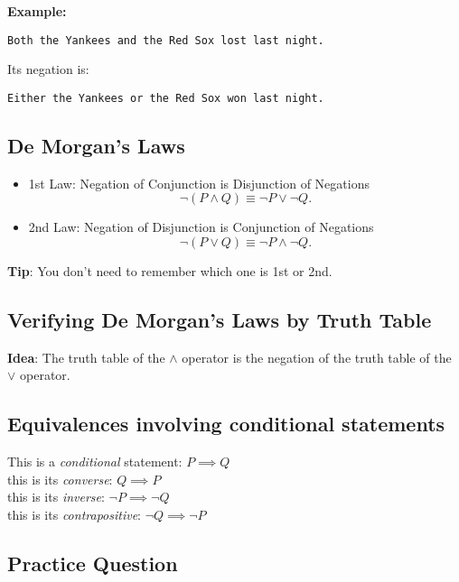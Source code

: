 \documentclass[11pt]{article}
\providecommand{\tightlist}{%
      \setlength{\itemsep}{0pt}\setlength{\parskip}{0pt}}
\begin{document}
\textbf{Example:}

\begin{verbatim}
Both the Yankees and the Red Sox lost last night.  
\end{verbatim}

Its negation is:

\begin{verbatim}
Either the Yankees or the Red Sox won last night.
\end{verbatim}

    \subsection{De Morgan's Laws}\label{de-morgans-laws}

\begin{itemize}
\tightlist
\item
  1st Law: Negation of Conjunction is Disjunction of Negations
  \[\neg (P \land Q) \equiv \neg P \lor \neg Q.\]
\item
  2nd Law: Negation of Disjunction is Conjunction of Negations
  \[\neg (P \lor Q) \equiv \neg P \land \neg Q.\]
\end{itemize}

    \textbf{Tip}: You don't need to remember which one is 1st or 2nd.

    \subsection{Verifying De Morgan's Laws by Truth
Table}\label{verifying-de-morgans-laws-by-truth-table}

\textbf{Idea}: The truth table of the \(\land\) operator is the negation
of the truth table of the \(\lor\) operator.

    \subsection{Equivalences involving conditional
statements}\label{equivalences-involving-conditional-statements}

This is a \emph{conditional} statement: \(P \implies Q\)\\
this is its \emph{converse}: \(Q \implies P\)\\
this is its \emph{inverse}: \(\neg P\implies \neg Q\)\\
this is its \emph{contrapositive}: \(\neg Q \implies \neg P\)

    \subsection{Practice Question}\label{practice-question}
\end{document}

